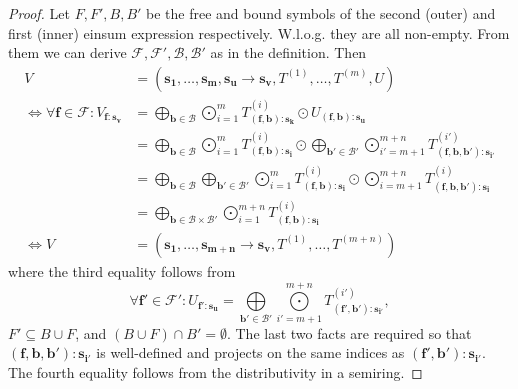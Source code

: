 \begin{proof}
    \small
    Let $F, F', B, B'$ be the free and bound symbols of the second (outer) and first (inner) einsum expression respectively.
    W.l.o.g. they are all non-empty.
    From them we can derive $\mathcal{F}, \mathcal{F}', \mathcal{B}, \mathcal{B}'$ as in the definition.
    Then
    \begin{align*}
        V                                                         & = (\bm{s_1},\dots,\bm{s_m}, \bm{s_u} \rightarrow \bm{s_v}, T^{(1)},\dots,T^{(m)}, U)                                                                                                                                                                \\
        \iff \forall \bm{f} \in \mathcal{F}: V_{\bm{f}: \bm{s_v}} & = \bigoplus\limits_{\bm{b} \in \mathcal{B}} \bigodot\limits_{i = 1}^{m} T^{(i)}_{(\bm{f}, \bm{b}):\bm{s_k}} \odot U_{(\bm{f}, \bm{b}):\bm{s_u}}                                                                                                     \\
                                                                  & = \bigoplus\limits_{\bm{b} \in \mathcal{B}} \bigodot\limits_{i = 1}^{m} T^{(i)}_{(\bm{f}, \bm{b}):\bm{s_i}} \odot \bigoplus\limits_{\bm{b'} \in \mathcal{B}'} \bigodot\limits_{i' = m + 1}^{m + n} T^{(i')}_{(\bm{f}, \bm{b}, \bm{b'}):\bm{s_{i'}}} \\
                                                                  & = \bigoplus\limits_{\bm{b} \in \mathcal{B}} \bigoplus\limits_{\bm{b'} \in \mathcal{B}'} \bigodot\limits_{i = 1}^{m} T^{(i)}_{(\bm{f}, \bm{b}):\bm{s_i}} \odot \bigodot\limits_{i = m + 1}^{m + n} T^{(i)}_{(\bm{f}, \bm{b}, \bm{b'}):\bm{s_{i}}}                                      \\
                                                                  & = \bigoplus\limits_{\bm{b} \in \mathcal{B} \times \mathcal{B}'} \bigodot\limits_{i = 1}^{m + n} T^{(i)}_{(\bm{f}, \bm{b}):\bm{s_i}}                                                                                                                               \\
        \iff V                                                    & = (\bm{s_1}, \dots, \bm{s_{m + n}} \rightarrow \bm{s_v}, T^{(1)}, \dots, T^{(m + n)})
    \end{align*}
    where the third equality follows from
    $$\forall \bm{f'} \in \mathcal{F}': U_{\bm{f'}: \bm{s_u}} = \bigoplus\limits_{\bm{b'} \in \mathcal{B}'} \bigodot\limits_{i' = m + 1}^{m + n} T^{(i')}_{(\bm{f'}, \bm{b'}):\bm{s_{i'}}},$$
    $F' \subseteq B \cup F$, and $(B \cup F) \cap B' = \emptyset$. The last two facts are required so that $(\bm{f}, \bm{b}, \bm{b'}):\bm{s_{i'}}$ is well-defined and projects on the same indices as $(\bm{f'}, \bm{b'}):\bm{s_{i'}}$.
    The fourth equality follows from the distributivity in a semiring.
\end{proof}